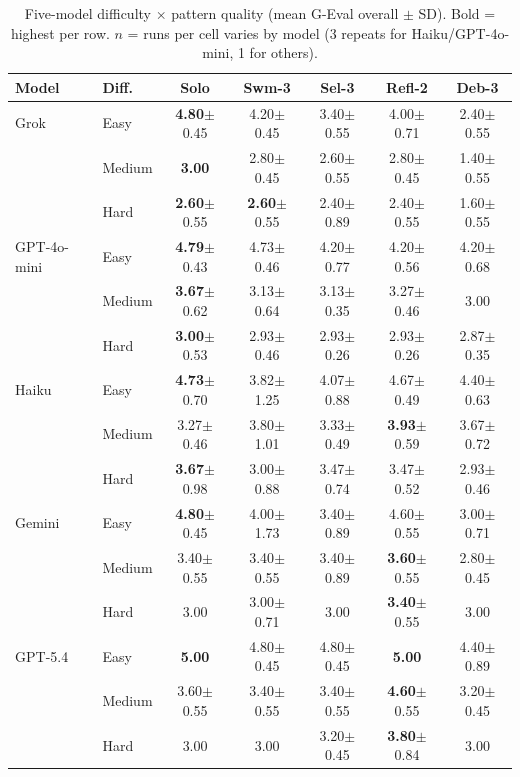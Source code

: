 \begin{table}[t]
\centering
\caption{Five-model difficulty $\times$ pattern quality (mean G-Eval overall $\pm$ SD). Bold = highest per row. $n$ = runs per cell varies by model (3 repeats for Haiku/GPT-4o-mini, 1 for others).}
\label{tab:difficulty_5model}
\vspace{-2mm}
{\footnotesize
\begin{tabular}{@{}llccccc@{}}
\toprule
\textbf{Model} & \textbf{Diff.} & \textbf{Solo} & \textbf{Swm-3} & \textbf{Sel-3} & \textbf{Refl-2} & \textbf{Deb-3} \\
\midrule
Grok & Easy & \textbf{4.80}$\pm$0.45 & 4.20$\pm$0.45 & 3.40$\pm$0.55 & 4.00$\pm$0.71 & 2.40$\pm$0.55 \\
 & Medium & \textbf{3.00} & 2.80$\pm$0.45 & 2.60$\pm$0.55 & 2.80$\pm$0.45 & 1.40$\pm$0.55 \\
 & Hard & \textbf{2.60}$\pm$0.55 & \textbf{2.60}$\pm$0.55 & 2.40$\pm$0.89 & 2.40$\pm$0.55 & 1.60$\pm$0.55 \\
\midrule
GPT-4o-mini & Easy & \textbf{4.79}$\pm$0.43 & 4.73$\pm$0.46 & 4.20$\pm$0.77 & 4.20$\pm$0.56 & 4.20$\pm$0.68 \\
 & Medium & \textbf{3.67}$\pm$0.62 & 3.13$\pm$0.64 & 3.13$\pm$0.35 & 3.27$\pm$0.46 & 3.00 \\
 & Hard & \textbf{3.00}$\pm$0.53 & 2.93$\pm$0.46 & 2.93$\pm$0.26 & 2.93$\pm$0.26 & 2.87$\pm$0.35 \\
\midrule
Haiku & Easy & \textbf{4.73}$\pm$0.70 & 3.82$\pm$1.25 & 4.07$\pm$0.88 & 4.67$\pm$0.49 & 4.40$\pm$0.63 \\
 & Medium & 3.27$\pm$0.46 & 3.80$\pm$1.01 & 3.33$\pm$0.49 & \textbf{3.93}$\pm$0.59 & 3.67$\pm$0.72 \\
 & Hard & \textbf{3.67}$\pm$0.98 & 3.00$\pm$0.88 & 3.47$\pm$0.74 & 3.47$\pm$0.52 & 2.93$\pm$0.46 \\
\midrule
Gemini & Easy & \textbf{4.80}$\pm$0.45 & 4.00$\pm$1.73 & 3.40$\pm$0.89 & 4.60$\pm$0.55 & 3.00$\pm$0.71 \\
 & Medium & 3.40$\pm$0.55 & 3.40$\pm$0.55 & 3.40$\pm$0.89 & \textbf{3.60}$\pm$0.55 & 2.80$\pm$0.45 \\
 & Hard & 3.00 & 3.00$\pm$0.71 & 3.00 & \textbf{3.40}$\pm$0.55 & 3.00 \\
\midrule
GPT-5.4 & Easy & \textbf{5.00} & 4.80$\pm$0.45 & 4.80$\pm$0.45 & \textbf{5.00} & 4.40$\pm$0.89 \\
 & Medium & 3.60$\pm$0.55 & 3.40$\pm$0.55 & 3.40$\pm$0.55 & \textbf{4.60}$\pm$0.55 & 3.20$\pm$0.45 \\
 & Hard & 3.00 & 3.00 & 3.20$\pm$0.45 & \textbf{3.80}$\pm$0.84 & 3.00 \\
\bottomrule
\end{tabular}
}
\end{table}